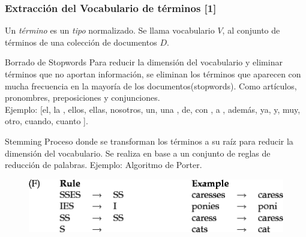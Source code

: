 \documentclass[handout]{beamer}
\begin{document}
\begin{frame}\frametitle{Extracción del Vocabulario de términos [1]}
\footnotesize{

Un \emph{término} es un \emph{tipo} normalizado. Se llama vocabulario $V$, al conjunto de términos de una colección de documentos $D$.
 
\begin{block}{Borrado de Stopwords}
Para reducir la dimensión del vocabulario y eliminar términos que no aportan información, se eliminan los términos que aparecen
con mucha frecuencia en la mayoría de los documentos(stopwords). Como artículos, pronombres,  preposiciones y conjunciones. \\
Ejemplo: [el, la , ellos, ellas,  nosotros, un, una , de, con , a , además, ya, y, muy, otro, cuando, cuanto ]. 
\end{block}

\begin{block}{Stemming}
Proceso donde se transforman los términos a su raíz para reducir la dimensión del vocabulario. Se realiza en base a un conjunto de reglas de reducción de palabras. Ejemplo: Algoritmo de Porter.

\begin{figure}[h!]
	\centering
	\includegraphics[scale=0.45]{pics/porter.png}
\end{figure}


\end{block}
}
 
\end{frame}
\end{document}
